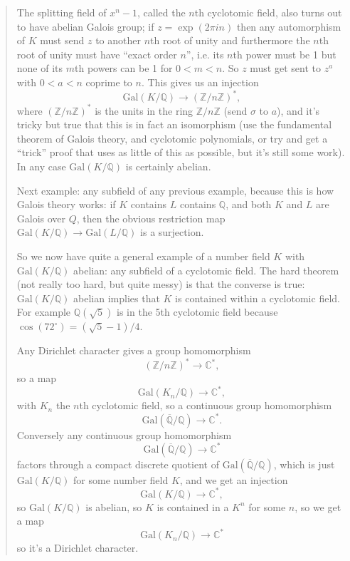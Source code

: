 \documentclass{article}
\begin{document}
\begin{quote}
The splitting field of \(x^n-1\), called the \(n\)th cyclotomic field,
also turns out to have abelian Galois group; if \(z = \exp(2\pi in)\)
then any automorphism of \(K\) must send \(z\) to another \(n\)th root
of unity and furthermore the \(n\)th root of unity must have ``exact
order \(n\)'', i.e. its \(n\)th power must be 1 but none of its \(m\)th
powers can be 1 for \(0 < m < n\). So \(z\) must get sent to \(z^a\)
with \(0 < a < n\) coprime to \(n\). This gives us an injection
\[\mathrm{Gal}(K/\mathbb{Q}) \to (\mathbb{Z}/n\mathbb{Z})^*,\] where
\((\mathbb{Z}/n\mathbb{Z})^*\) is the units in the ring
\(\mathbb{Z}/n\mathbb{Z}\) (send \(\sigma\) to \(a\)), and it's tricky
but true that this is in fact an isomorphism (use the fundamental
theorem of Galois theory, and cyclotomic polynomials, or try and get a
``trick'' proof that uses as little of this as possible, but it's still
some work). In any case \(\mathrm{Gal}(K/\mathbb{Q})\) is certainly
abelian.

Next example: any subfield of any previous example, because this is how
Galois theory works: if \(K\) contains \(L\) contains \(\mathbb{Q}\),
and both \(K\) and \(L\) are Galois over \(Q\), then the obvious
restriction map
\(\mathrm{Gal}(K/\mathbb{Q}) \to \mathrm{Gal}(L/\mathbb{Q})\) is a
surjection.

So we now have quite a general example of a number field \(K\) with
\(\mathrm{Gal}(K/\mathbb{Q})\) abelian: any subfield of a cyclotomic
field. The hard theorem (not really too hard, but quite messy) is that
the converse is true: \(\mathrm{Gal}(K/\mathbb{Q})\) abelian implies
that \(K\) is contained within a cyclotomic field. For example
\(\mathbb{Q}(\sqrt{5})\) is in the 5th cyclotomic field because
\(\cos(72^\circ) = (\sqrt{5}-1)/4\).

Any Dirichlet character gives a group homomorphism
\[(\mathbb{Z}/n\mathbb{Z})^* \to \mathbb{C}^*,\] so a map
\[\mathrm{Gal}(K_n/\mathbb{Q}) \to \mathbb{C}^*,\] with \(K_n\) the
\(n\)th cyclotomic field, so a continuous group homomorphism
\[\mathrm{Gal}(\overline{\mathbb{Q}}/\mathbb{Q}) \to \mathbb{C}^*.\]
Conversely any continuous group homomorphism
\[\mathrm{Gal}(\overline{\mathbb{Q}}/\mathbb{Q}) \to \mathbb{C}^*\]
factors through a compact discrete quotient of
\(\mathrm{Gal}(\overline{\mathbb{Q}}/\mathbb{Q})\), which is just
\(\mathrm{Gal}(K/\mathbb{Q})\) for some number field \(K\), and we get
an injection \[\mathrm{Gal}(K/\mathbb{Q}) \to \mathbb{C}^*,\] so
\(\mathrm{Gal}(K/\mathbb{Q})\) is abelian, so \(K\) is contained in a
\(K^n\) for some \(n\), so we get a map
\[\mathrm{Gal}(K_n/\mathbb{Q}) \to \mathbb{C}^*\] so it's a Dirichlet
character.


\end{quote}
\end{document}
